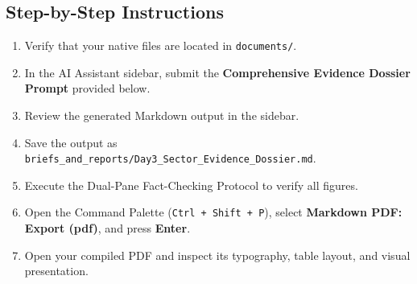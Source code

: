 \documentclass[11pt, a4paper]{report}
\begin{document}
\subsection{Step-by-Step Instructions}
\begin{enumerate}[label=\textbf{Step \arabic*:}]
    \item Verify that your native files are located in \texttt{documents/}.
    \item In the AI Assistant sidebar, submit the \textcolor{tanzaniablue}{\textbf{Comprehensive Evidence Dossier Prompt}} provided below.
    \item Review the generated Markdown output in the sidebar.
    \item Save the output as \texttt{briefs\_and\_reports/Day3\_Sector\_Evidence\_Dossier.md}.
    \item Execute the Dual-Pane Fact-Checking Protocol to verify all figures.
    \item Open the Command Palette (\texttt{Ctrl + Shift + P}), select \textbf{Markdown PDF: Export (pdf)}, and press \textbf{Enter}.
    \item Open your compiled PDF and inspect its typography, table layout, and visual presentation.
\end{enumerate}
\end{document}
